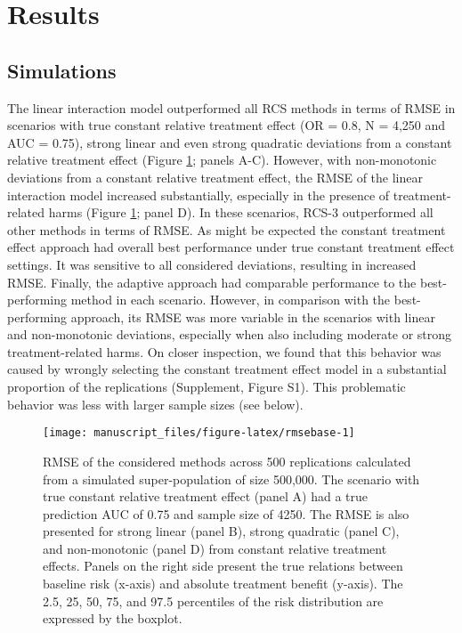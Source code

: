 \documentclass[]{elsarticle} %
\begin{document}
\hypertarget{results}{%
\section{Results}\label{results}}

\hypertarget{simulations}{%
\subsection{Simulations}\label{simulations}}

The linear interaction model outperformed all RCS methods in terms of
RMSE in scenarios with true constant relative treatment effect (OR =
0.8, N = 4,250 and AUC = 0.75), strong linear and even strong quadratic
deviations from a constant relative treatment effect (Figure
\ref{fig:rmsebase}; panels A-C). However, with non-monotonic deviations
from a constant relative treatment effect, the RMSE of the linear
interaction model increased substantially, especially in the presence of
treatment-related harms (Figure \ref{fig:rmsebase}; panel D). In these
scenarios, RCS-3 outperformed all other methods in terms of RMSE. As
might be expected the constant treatment effect approach had overall
best performance under true constant treatment effect settings. It was
sensitive to all considered deviations, resulting in increased RMSE.
Finally, the adaptive approach had comparable performance to the
best-performing method in each scenario. However, in comparison with the
best-performing approach, its RMSE was more variable in the scenarios
with linear and non-monotonic deviations, especially when also including
moderate or strong treatment-related harms. On closer inspection, we
found that this behavior was caused by wrongly selecting the constant
treatment effect model in a substantial proportion of the replications
(Supplement, Figure S1). This problematic behavior was less with larger
sample sizes (see below).

\begin{figure}
\texttt{[image: manuscript\_files/figure-latex/rmsebase-1]} \caption{RMSE of the considered methods across 500 replications calculated from a simulated super-population of size 500,000. The scenario with true constant relative treatment effect (panel A) had a true prediction AUC of 0.75 and sample size of 4250. The RMSE is also presented for strong linear (panel B), strong quadratic (panel C), and non-monotonic (panel D) from constant relative treatment effects. Panels on the right side present the true relations between baseline risk (x-axis) and absolute treatment benefit (y-axis). The 2.5, 25, 50, 75, and 97.5 percentiles of the risk distribution are expressed by the boxplot.}\label{fig:rmsebase}
\end{figure}
\end{document}
